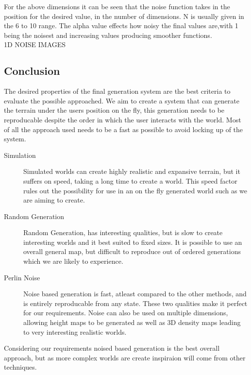 For the above dimensions it can be seen that the noise function takes in the 
position for the desired value, in the number of dimensions. N is usually given
in the 6 to 10 range. The alpha value effects how noisy the final values are,with
1 being the noisest and increasing values producing smoother functions.\\

1D NOISE IMAGES\\


\subsection{Conclusion}
The desired properties of the final generation system are the best criteria to
evaluate the possible approached. We aim to create a system that can generate
the terrain under the users position on the fly, this generation needs to be
reproducable despite the order in which the user interacts with the world. Most
of all the approach used needs to be a fast as possible to avoid locking up of
the system.\\

\begin{description}
\item[Simulation]
Simulated worlds can create highly realistic
and expansive terrain, but it suffers on speed, taking a long time to create a 
world. This speed factor rules out the possibility for use in an on the fly 
generated world such as we are aiming to create. 

\item[Random Generation] Random Generation, has 
interesting qualities, but is slow to create interesting worlds and it best
suited to fixed sizes. It is possible to use an overall general map, but 
difficult to reproduce out of ordered generations which we are likely to
experience. 

\item[Perlin Noise] Noise based generation is fast, atleast compared to the other
methods, and is entirely reproducable from any state. These two qualities make it
perfect for our requirements. Noise can also be used on multiple dimensions, 
allowing height maps to be generated as well as 3D density maps leading to very
interesting realistic worlds.
\end{description}

Considering our requirements noised based generation is the best overall 
approach,
but as more complex worlds are create inspiraion will come from other 
techniques.\\
